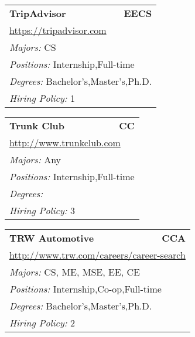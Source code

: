 \documentclass[twoside]{article}
\begin{document}
\begin{center}
\begin{multicols}{3}
\begin{FlushLeft}
\begin{minipage}{.9\columnwidth}
\end{minipage}
 
\begin{minipage}{.9\columnwidth}\begin{tabularx}{.95\columnwidth}{Xr}
                 {\Large\bf TripAdvisor} & {\Large\bf EECS}\\
    \multicolumn{2}{p{.95\columnwidth}}{\url{https://tripadvisor.com}}\\
    \multicolumn{2}{p{.95\columnwidth}}{\emph{Majors:} CS}\\
    \multicolumn{2}{p{.95\columnwidth}}{\emph{Positions:} Internship,Full-time}\\
    \multicolumn{2}{p{.95\columnwidth}}{\emph{Degrees:} Bachelor's,Master's,Ph.D.}\\
    \multicolumn{2}{p{.95\columnwidth}}{\emph{Hiring Policy:} 1}\\
    \end{tabularx}
    
\end{minipage}
 
\begin{minipage}{.9\columnwidth}\begin{tabularx}{.95\columnwidth}{Xr}
                 {\Large\bf Trunk Club} & {\Large\bf CC}\\
    \multicolumn{2}{p{.95\columnwidth}}{\url{http://www.trunkclub.com}}\\
    \multicolumn{2}{p{.95\columnwidth}}{\emph{Majors:} Any}\\
    \multicolumn{2}{p{.95\columnwidth}}{\emph{Positions:} Internship,Full-time}\\
    \multicolumn{2}{p{.95\columnwidth}}{\emph{Degrees:} }\\
    \multicolumn{2}{p{.95\columnwidth}}{\emph{Hiring Policy:} 3}\\
    \end{tabularx}
    
\end{minipage}
 
\begin{minipage}{.9\columnwidth}\begin{tabularx}{.95\columnwidth}{Xr}
                 {\Large\bf TRW Automotive} & {\Large\bf CCA}\\
    \multicolumn{2}{p{.95\columnwidth}}{\url{http://www.trw.com/careers/career-search}}\\
    \multicolumn{2}{p{.95\columnwidth}}{\emph{Majors:} CS, ME, MSE, EE, CE}\\
    \multicolumn{2}{p{.95\columnwidth}}{\emph{Positions:} Internship,Co-op,Full-time}\\
    \multicolumn{2}{p{.95\columnwidth}}{\emph{Degrees:} Bachelor's,Master's,Ph.D.}\\
    \multicolumn{2}{p{.95\columnwidth}}{\emph{Hiring Policy:} 2}\\
    \end{tabularx}
    

\end{minipage}
\end{FlushLeft}
\end{multicols}
\end{center}
\end{document}
